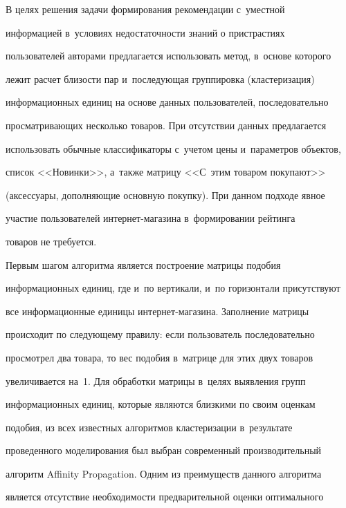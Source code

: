 \vspace*{-2pt}





  В целях решения задачи формирования рекомендации с~уместной 


информацией в~условиях недостаточности знаний о пристрастиях 


пользователей авторами предлагается использовать метод, в~основе которого 


лежит расчет близости пар и~последующая группировка (кластеризация) 


информационных единиц на основе данных пользователей, последовательно 


просматривающих несколько товаров. При отсутствии данных предлагается 


использовать обычные классификаторы с~учетом цены и~параметров объектов, 


список <<Новинки>>, а~также матрицу <<С~этим товаром покупают>> 


(аксессуары, дополняющие основную покупку). При данном подходе явное 


участие пользователей ин\-тер\-нет-ма\-га\-зи\-на в~формировании рейтинга 


товаров не требуется.


  


  Первым шагом алгоритма является построение матрицы подобия 


информационных единиц, где и~по вертикали, и~по горизонтали присутствуют 


все информационные единицы интернет-магазина. Заполнение матрицы 


происходит по следующему правилу: если пользователь последовательно 


просмотрел два товара, то вес подобия в~матрице для этих двух товаров 


увеличивается на~1. Для обработки матрицы в~целях выявления групп 


информационных единиц, которые являются близкими по своим оценкам 


подобия, из всех известных алгоритмов кластеризации в~результате 


проведенного моделирования был выбран современный производительный 


алгоритм Affinity Propagation. Одним из преимуществ данного алгоритма 


является отсутствие необходимости предварительной оценки оптимального 



